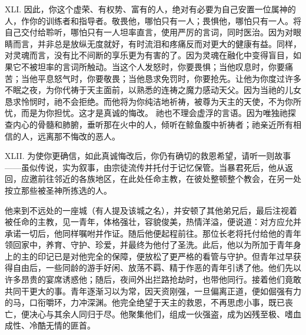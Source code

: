 XLI. 因此，你这个虚荣、有权势、富有的人，绝对有必要为自己安置一位属神的人，作你的训练者和指导者。敬畏他，哪怕只有一人；畏惧他，哪怕只有一人。将自己交付给聆听，哪怕只有一人坦率直言，使用严厉的言词，同时医治。因为对眼睛而言，并非总是放纵无度就好，有时流泪和疼痛反而对更大的健康有益。同样，对灵魂而言，没有比不间断的享乐更为有害的了。因为灵魂在融化中变得盲目，如果它不被坦率的言词所触动。当这个人发怒时，你要畏惧；当他叹息时，你要痛苦；当他平息怒气时，你要敬畏；当他恳求免罚时，你要抢先。让他为你度过许多不眠之夜，为你代祷于天主面前，以熟悉的连祷之魔力感动天父。因为当祂的儿女恳求怜悯时，祂不会拒绝。而他将为你纯洁地祈祷，被尊为天主的天使，不为你所忧，而是为你担忧。这才是真诚的悔改。  祂也不理会虚浮的言语。因为唯独祂探查内心的骨髓和肺腑，垂听那在火中的人，倾听在鲸鱼腹中祈祷者；祂亲近所有相信的人，远离那不悔改的恶人。\par

XLII. 为使你更确信，如此真诚悔改后，你仍有确切的救恩希望，请听一则故事——虽似传说，实为叙事，由宗徒流传并托付于记忆保管。当暴君死后，他从返回，应邀前往邻近的各族地区，在此处任命主教，在彼处整顿整个教会，在另一处按立那些被圣神所拣选的人。\par

他来到不远处的一座城（有人提及该城之名），并安顿了其他弟兄后，最后注视着被任命的主教，见一青年，体格强壮，容貌俊美，热情洋溢，便说道：对方应允并承诺一切后，他同样嘱咐并作证。随后他便起程前往。那位长老将托付给他的青年领回家中，养育、守护、珍爱，并最终为他付了圣洗。此后，他以为所加于青年身上的主的印记已是对他完全的保障，便放松了更严格的看管与守护。但青年过早获得自由后，一些同龄的游手好闲、放荡不羁、精于作恶的青年引诱了他。他们先以许多昂贵的宴席诱惑他；随后，夜间外出拦路抢劫时，也带他同行。接着他们竟敢共同干更大的事。青年逐渐习以为常，因天资刚强，一旦偏离正道，便如倔强有力的马，口衔嚼环，力冲深渊。他完全绝望于天主的救恩，不再思虑小事，既已丧亡，便决心与其余人同归于尽。他聚集他们，组成一伙强盗，成为凶残至极、嗜血成性、冷酷无情的匪首。\par

